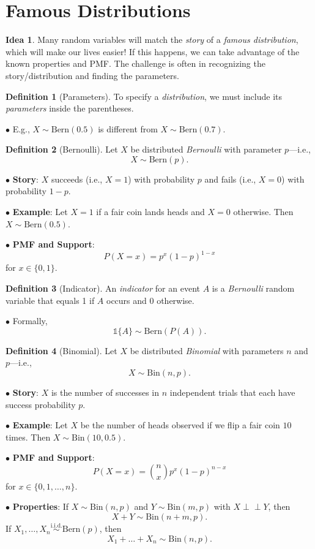\documentclass[12pt,oneside]{article}
\newcommand{\indep}{\perp\!\!\!\perp}
\newcommand{\Bern}{\text{Bern}}
\newcommand{\Bin}{\text{Bin}}
\newcommand{\simiid}{\overset{\text{i.i.d.}}{\sim}}
\newcommand{\indic}{\mathds{1}}
\theoremstyle{definition}
\newtheorem{definition}{Definition}
\newtheorem*{idea}{Idea}
\theoremstyle{remark}
\begin{document}
\section{Famous Distributions}

\begin{idea}
Many random variables will match the \textit{story} of a \textit{famous distribution}, which will make our lives easier! If this happens, we can take advantage of the known properties and PMF. The challenge is often in recognizing the story/distribution and finding the parameters.
\end{idea}

\begin{definition}[Parameters]
To specify a \textit{distribution}, we must include its \textit{parameters} inside the parentheses.

$\bullet$ E.g., $X \sim \Bern(0.5)$ is different from $X \sim \Bern(0.7)$.
\end{definition}

\begin{definition}[Bernoulli]
Let $X$ be distributed \textit{Bernoulli} with parameter $p$—i.e., \[X \sim \Bern(p).\]

$\bullet$ \textbf{Story}: $X$ succeeds (i.e., $X = 1$) with probability $p$ and fails (i.e., $X = 0$) with probability $1 - p$.

$\bullet$ \textbf{Example}: Let $X = 1$ if a fair coin lands heads and $X = 0$ otherwise. Then $X \sim \Bern(0.5)$.

$\bullet$ \textbf{PMF and Support}: \[P(X = x) = p^x (1 - p)^{1 - x}\] for $x \in \{0, 1\}$.
\end{definition}

\begin{definition}[Indicator]
An \textit{indicator} for an event $A$ is a \textit{Bernoulli} random variable that equals 1 if $A$ occurs and 0 otherwise. 

$\bullet$ Formally, \[\indic\{A\} \sim \Bern(P(A)).\]
\end{definition}

\begin{definition}[Binomial]
Let $X$ be distributed \textit{Binomial} with parameters $n$ and $p$—i.e., \[X \sim \Bin(n, p).\]

$\bullet$ \textbf{Story}: $X$ is the number of successes in $n$ independent trials that each have success probability $p$.

$\bullet$ \textbf{Example}: Let $X$ be the number of heads observed if we flip a fair coin $10$ times. Then $X \sim \Bin(10, 0.5)$.

$\bullet$ \textbf{PMF and Support}: \[P(X = x) = \binom{n}{x} p^x (1 - p)^{n - x}\] for $x \in \{0, 1, \ldots, n\}$.

$\bullet$ \textbf{Properties}: If $X \sim \Bin(n, p)$ and $Y \sim \Bin(m, p)$ with $X \indep Y$, then \[X + Y \sim \Bin(n + m, p).\] If $X_1, \ldots, X_n \simiid \Bern(p)$, then \[X_1 + \ldots + X_n \sim \Bin(n, p).\]
\end{definition}
\end{document}

